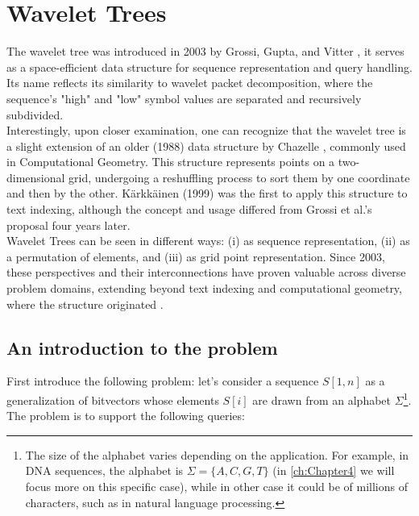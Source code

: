 \clearpage
\section{Wavelet Trees}

The wavelet tree was introduced in 2003 by Grossi, Gupta, and Vitter \cite{GrossiWT2003}, it serves as a space-efficient data structure for sequence representation and query handling. Its name reflects its similarity to wavelet packet decomposition, where the sequence's "high" and "low" symbol values are separated and recursively subdivided. \\

\noindent Interestingly, upon closer examination, one can recognize that the wavelet tree is a slight extension of an older (1988) data structure by Chazelle \cite{Chazelle1988}, commonly used in Computational Geometry. This structure represents points on a two-dimensional grid, undergoing a reshuffling process to sort them by one coordinate and then by the other. Kärkkäinen (1999) \cite{karkkainen1999repetition} was the first to apply this structure to text indexing, although the concept and usage differed from Grossi et al.'s proposal four years later. \\

\noindent Wavelet Trees can be seen in different ways: (i) as sequence representation, (ii) as a permutation of elements, and (iii) as grid point representation. Since 2003, these perspectives and their interconnections have proven valuable across diverse problem domains, extending beyond text indexing and computational geometry, where the structure originated \cite{WTForALL,WTFromTheoryToPractice,TheMyriadVirtuesWT}.

\subsection*{An introduction to the problem}
First introduce the following problem: let's consider a sequence $S[1,n]$ as a generalization of bitvectors whose elements $S[i]$ are drawn from an alphabet $\Sigma$\footnote{The size of the alphabet varies depending on the application. For example, in DNA sequences, the alphabet is $\Sigma = \{A,C,G,T\}$ (in \autoref{ch:Chapter4} we will focus more on this specific case), while in other case it could be of millions of characters, such as in natural language processing.}. The problem is to support the following queries:

